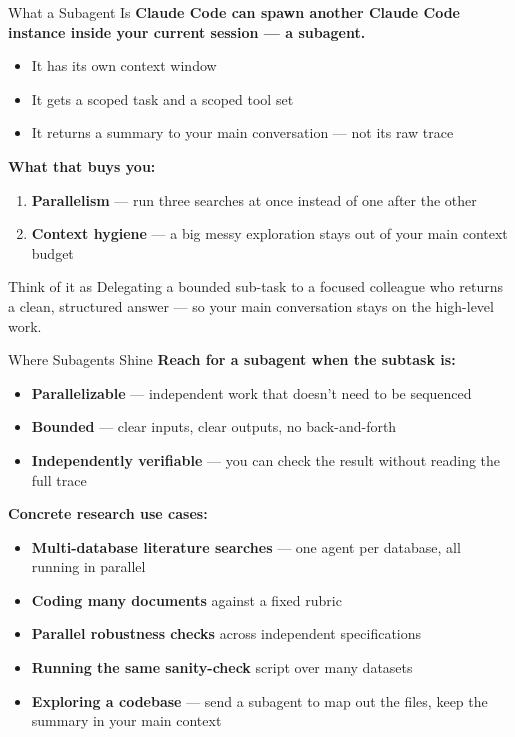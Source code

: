 \documentclass[aspectratio=169, 11pt]{beamer}
\begin{document}
\begin{frame}{What a Subagent Is}
  \textbf{Claude Code can spawn another Claude Code instance inside your current session --- a subagent.}

  \vspace{0.6em}
  \begin{itemize}
    \item It has its own context window
    \item It gets a scoped task and a scoped tool set
    \item It returns a summary to your main conversation --- not its raw trace
  \end{itemize}

  \vspace{0.8em}
  \textbf{What that buys you:}
  \begin{enumerate}
    \item \textbf{Parallelism} --- run three searches at once instead of one after the other
    \item \textbf{Context hygiene} --- a big messy exploration stays out of your main context budget
  \end{enumerate}

  \vspace{0.5em}
  \begin{block}{Think of it as}
    Delegating a bounded sub-task to a focused colleague who returns a clean, structured answer --- so your main conversation stays on the high-level work.
  \end{block}
\end{frame}

\begin{frame}{Where Subagents Shine}
  \textbf{Reach for a subagent when the subtask is:}
  \begin{itemize}
    \item \textbf{Parallelizable} --- independent work that doesn't need to be sequenced
    \item \textbf{Bounded} --- clear inputs, clear outputs, no back-and-forth
    \item \textbf{Independently verifiable} --- you can check the result without reading the full trace
  \end{itemize}

  \vspace{0.7em}
  \textbf{Concrete research use cases:}
  \begin{itemize}
    \item \textbf{Multi-database literature searches} --- one agent per database, all running in parallel
    \item \textbf{Coding many documents} against a fixed rubric
    \item \textbf{Parallel robustness checks} across independent specifications
    \item \textbf{Running the same sanity-check} script over many datasets
    \item \textbf{Exploring a codebase} --- send a subagent to map out the files, keep the summary in your main context
  \end{itemize}
\end{frame}
\end{document}
